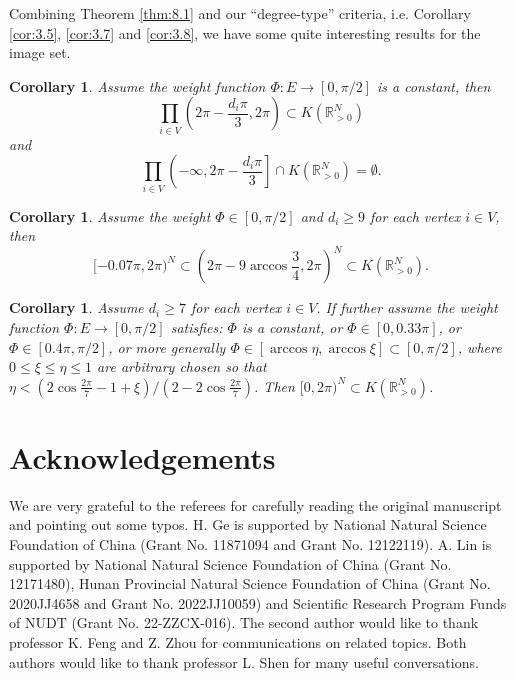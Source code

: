 \documentclass[12pt]{amsart}
\numberwithin{equation}{section}
\newtheorem{cor}[prop]{Corollary}
\begin{document}
Combining Theorem \ref{thm:8.1} and our ``degree-type'' criteria, i.e. Corollary \ref{cor:3.5}, \ref{cor:3.7} and \ref{cor:3.8}, we have some
quite interesting results for the image set.

\begin{cor}\label{cor:8.3}
Assume the weight function $\Phi: E \to [0,\pi/2]$ is a constant, then
\[
\prod_{i \in V}\left(2\pi - \frac{d_i \pi}{3}, 2\pi\right) \subset K(\mathbb{R}^N_{>0})
\]
and
\[
\prod_{i \in V}\left(-\infty, 2\pi - \frac{d_i \pi}{3}\right] \cap K(\mathbb{R}^N_{>0}) = \emptyset.
\]
\end{cor}

\begin{cor}\label{cor:8.4}
Assume the weight $\Phi \in [0,\pi/2]$ and $d_i \geq 9$ for each vertex $i \in V$, then
\[
[-0.07\pi, 2\pi)^N \subset \left(2\pi - 9\arccos\frac{3}{4}, 2\pi\right)^N \subset K(\mathbb{R}^N_{>0}).
\]
\end{cor}

\begin{cor}\label{cor:8.5}
Assume $d_i \geq 7$ for each vertex $i \in V$. If further assume the weight function $\Phi :
E \to [0,\pi/2]$ satisfies: $\Phi$ is a constant, or $\Phi \in [0, 0.33\pi]$, or $\Phi \in [0.4\pi, \pi/2]$, or more generally $\Phi \in
[\arccos\eta, \arccos\xi] \subset [0,\pi/2]$, where $0 \leq \xi \leq \eta \leq 1$ are arbitrary chosen so that $\eta < (2\cos\frac{2\pi}{7} - 1 + \xi)/(2 -
2\cos\frac{2\pi}{7})$. Then $[0, 2\pi)^N \subset K(\mathbb{R}^N_{>0})$.
\end{cor}

\section*{Acknowledgements}

We are very grateful to the referees for carefully reading the original manuscript and
pointing out some typos. H. Ge is supported by National Natural Science Foundation of China (Grant No.
11871094 and Grant No. 12122119). A. Lin is supported by National Natural Science Foundation of China
(Grant No. 12171480), Hunan Provincial Natural Science Foundation of China (Grant No. 2020JJ4658 and
Grant No. 2022JJ10059) and Scientific Research Program Funds of NUDT (Grant No. 22-ZZCX-016). The
second author would like to thank professor K. Feng and Z. Zhou for communications on related topics. Both
authors would like to thank professor L. Shen for many useful conversations.
\end{document}
